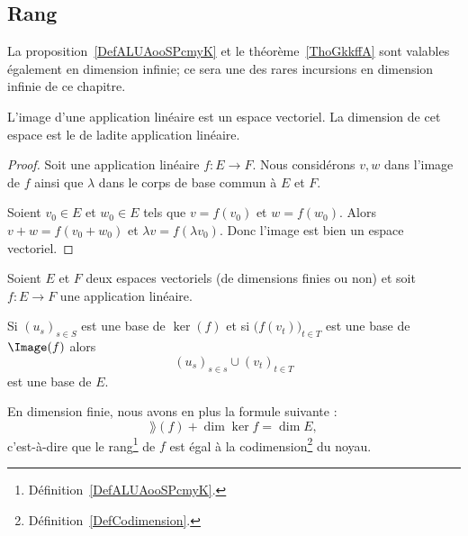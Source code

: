 \subsection{Rang}

La proposition~\ref{DefALUAooSPcmyK} et le théorème~\ref{ThoGkkffA} sont valables également en dimension infinie; ce sera une des rares incursions en dimension infinie de ce chapitre.
\begin{propositionDef}\label{DefALUAooSPcmyK}
    L'image d'une application linéaire est un espace vectoriel. La dimension de cet espace est le  de ladite application linéaire.
\end{propositionDef}

\begin{proof}
    Soit une application linéaire \( f\colon E\to F\). Nous considérons \( v,w\) dans l'image de \( f\) ainsi que \( \lambda\) dans le corps de base commun à \( E\) et \( F\).

    Soient \( v_0\in E\) et \( w_0\in E\) tels que \( v=f(v_0)\) et \( w=f(w_0)\). Alors \( v+w=f(v_0+w_0)\) et \( \lambda v=f(\lambda v_0)\). Donc l'image est bien un espace vectoriel.
\end{proof}

\begin{theorem}       \label{ThoGkkffA}
    Soient \( E\) et \( F\) deux espaces vectoriels (de dimensions finies ou non) et soit \( f\colon E\to F\) une application linéaire. 
    
   Si \( (u_s)_{s\in S}\) est une base de \( \ker(f)\) et si \( \big( f(v_t) \big)_{t\in T}\) est une base de \( \Image(f)\) alors 
   \begin{equation}
   (u_s)_{s\in s}\cup (v_t)_{t\in T}
   \end{equation}
   est une base de \( E\).
    
   En dimension finie, nous avons en plus la formule suivante :
   \begin{equation}     \label{EQooUEOQooLySRiE}
       \rang(f)+\dim\ker f=\dim E,
   \end{equation}
   c'est-à-dire que le rang\footnote{Définition~\ref{DefALUAooSPcmyK}.} de \( f\) est égal à la codimension\footnote{Définition~\ref{DefCodimension}.} du noyau.
\end{theorem}

